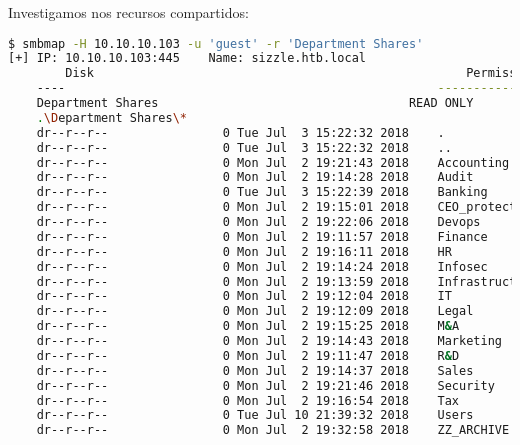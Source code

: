 \documentclass[a4paper]{article}
\begin{document}
        Investigamos nos recursos compartidos:
        \begin{lstlisting}[language=Bash, caption=Recurso compartido: Department Shares]
$ smbmap -H 10.10.10.103 -u 'guest' -r 'Department Shares'
[+] IP: 10.10.10.103:445	Name: sizzle.htb.local                                  
        Disk                                                  	Permissions	Comment
	----                                                  	-----------	-------
	Department Shares                                 	READ ONLY	
	.\Department Shares\*
	dr--r--r--                0 Tue Jul  3 15:22:32 2018	.
	dr--r--r--                0 Tue Jul  3 15:22:32 2018	..
	dr--r--r--                0 Mon Jul  2 19:21:43 2018	Accounting
	dr--r--r--                0 Mon Jul  2 19:14:28 2018	Audit
	dr--r--r--                0 Tue Jul  3 15:22:39 2018	Banking
	dr--r--r--                0 Mon Jul  2 19:15:01 2018	CEO_protected
	dr--r--r--                0 Mon Jul  2 19:22:06 2018	Devops
	dr--r--r--                0 Mon Jul  2 19:11:57 2018	Finance
	dr--r--r--                0 Mon Jul  2 19:16:11 2018	HR
	dr--r--r--                0 Mon Jul  2 19:14:24 2018	Infosec
	dr--r--r--                0 Mon Jul  2 19:13:59 2018	Infrastructure
	dr--r--r--                0 Mon Jul  2 19:12:04 2018	IT
	dr--r--r--                0 Mon Jul  2 19:12:09 2018	Legal
	dr--r--r--                0 Mon Jul  2 19:15:25 2018	M&A
	dr--r--r--                0 Mon Jul  2 19:14:43 2018	Marketing
	dr--r--r--                0 Mon Jul  2 19:11:47 2018	R&D
	dr--r--r--                0 Mon Jul  2 19:14:37 2018	Sales
	dr--r--r--                0 Mon Jul  2 19:21:46 2018	Security
	dr--r--r--                0 Mon Jul  2 19:16:54 2018	Tax
	dr--r--r--                0 Tue Jul 10 21:39:32 2018	Users
	dr--r--r--                0 Mon Jul  2 19:32:58 2018	ZZ_ARCHIVE\end{lstlisting}
\end{document}
